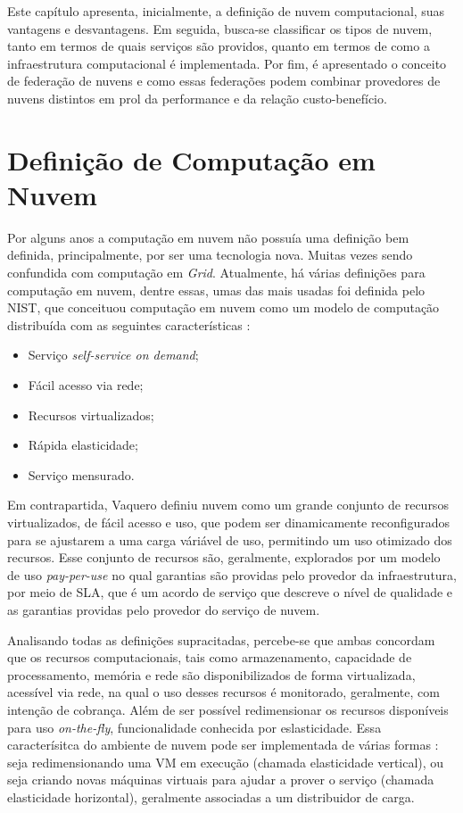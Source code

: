 Este capítulo apresenta, inicialmente, a definição de nuvem computacional, suas vantagens e desvantagens. Em seguida, busca-se classificar os tipos de nuvem, tanto em termos de quais serviços são providos, quanto em termos de como a infraestrutura computacional é implementada. Por fim, é apresentado o conceito de federação de nuvens e como essas federações podem combinar provedores de nuvens distintos em prol da performance e da relação custo-benefício.

\section{Definição de Computação em Nuvem}

Por alguns anos a computação em nuvem não possuía uma definição bem definida, principalmente, por ser uma tecnologia nova. Muitas vezes sendo confundida com computação em \textit{Grid}\cite{Vaquero:2008:BCT:1496091.1496100_Cloud_definition}. Atualmente, há várias definições para computação em nuvem, dentre essas, umas das mais usadas foi definida pelo \acrfull{NIST}, que conceituou computação em nuvem como um modelo de computação distribuída com as seguintes características \cite{NIST_CLOUD_DEFINITION}: 
\begin{itemize}
	\item Serviço \textit{self-service on demand};
	\item Fácil acesso via rede;
	\item Recursos virtualizados;
	\item Rápida elasticidade; 
	\item Serviço mensurado.
\end{itemize}

Em contrapartida, Vaquero\cite{Vaquero:2008:BCT:1496091.1496100_Cloud_definition} definiu nuvem como um grande conjunto de recursos virtualizados, de fácil acesso e uso, que podem ser dinamicamente reconfigurados para se ajustarem a uma carga váriável de uso, permitindo um uso otimizado dos recursos. Esse conjunto de recursos são, geralmente, explorados por um modelo de uso \textit{pay-per-use} no qual garantias são providas pelo provedor da infraestrutura, por meio de \acrfull{SLA}, que é um acordo de serviço que descreve o nível de qualidade e as garantias providas pelo provedor do serviço de nuvem.

Analisando todas as definições supracitadas, percebe-se que ambas concordam que os recursos computacionais, tais como armazenamento, capacidade de processamento, memória e rede são disponibilizados de forma virtualizada, acessível via rede, na qual o uso desses recursos é monitorado, geralmente, com intenção de cobrança. Além de ser possível redimensionar os recursos disponíveis para uso \textit{on-the-fly}, funcionalidade conhecida por eslasticidade. Essa caracterísitca do ambiente de nuvem pode ser implementada de várias formas \cite{Coutinho2015}: seja redimensionando uma \acrfull{VM} em execução (chamada elasticidade vertical), ou seja criando novas máquinas virtuais para ajudar a prover o serviço (chamada elasticidade horizontal), geralmente associadas a um distribuidor de carga.

